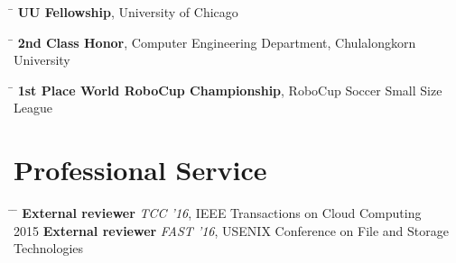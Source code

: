 \documentclass[10pt]{article} %
\begin{document}


\begin{tabbing}
\hspace{2.5cm} \=  \> \textbf{UU Fellowship}, University of Chicago
\end{tabbing}

\begin{tabbing}
\hspace{2.5cm} \=  \> \textbf{2nd Class Honor}, Computer Engineering Department, Chulalongkorn University
\end{tabbing}

\begin{tabbing}
\hspace{2.5cm} \=  \> \textbf{1st Place World RoboCup Championship}, RoboCup Soccer Small Size League
\end{tabbing}




\section{Professional Service}

\begin{tabbing}
\hspace{2.5cm} \= \hspace{3.5cm}  \=  \> \textbf{External reviewer} \> \textit{TCC '16}, IEEE Transactions on Cloud Computing \\
2015 \> \textbf{External reviewer} \> \textit{FAST '16}, USENIX Conference on File and Storage Technologies
\end{tabbing}

\end{document}
